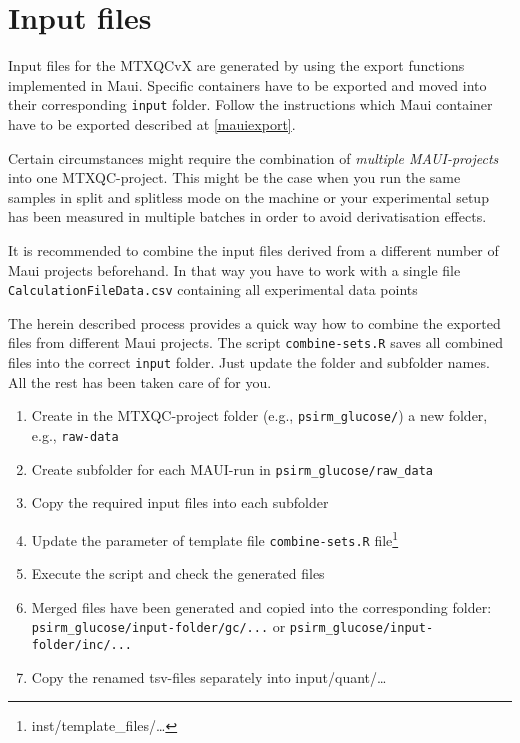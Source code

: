\documentclass[]{book}
\providecommand{\tightlist}{%
  \setlength{\itemsep}{0pt}\setlength{\parskip}{0pt}}
\let\rmarkdownfootnote\footnote%
\def\footnote{\protect\rmarkdownfootnote}
\theoremstyle{definition}
\theoremstyle{definition}
\theoremstyle{definition}
\theoremstyle{remark}
\begin{document}
\section{Input files}\label{input-files}

Input files for the MTXQCvX are generated by using the export functions
implemented in Maui. Specific containers have to be exported and moved
into their corresponding \texttt{input} folder. Follow the instructions
which Maui container have to be exported described at \ref{mauiexport}.

Certain circumstances might require the combination of \emph{multiple
MAUI-projects} into one MTXQC-project. This might be the case when you
run the same samples in split and splitless mode on the machine or your
experimental setup has been measured in multiple batches in order to
avoid derivatisation effects.

It is recommended to combine the input files derived from a different
number of Maui projects beforehand. In that way you have to work with a
single file \texttt{CalculationFileData.csv} containing all experimental
data points

The herein described process provides a quick way how to combine the
exported files from different Maui projects. The script
\texttt{combine-sets.R} saves all combined files into the correct
\texttt{input} folder. Just update the folder and subfolder names. All
the rest has been taken care of for you.

\begin{enumerate}
\def\labelenumi{\arabic{enumi}.}
\tightlist
\item
  Create in the MTXQC-project folder (e.g., \texttt{psirm\_glucose/}) a
  new folder, e.g., \texttt{raw-data}
\item
  Create subfolder for each MAUI-run in
  \texttt{psirm\_glucose/raw\_data}
\item
  Copy the required input files into each subfolder
\item
  Update the parameter of template file \texttt{combine-sets.R}
  file\footnote{inst/template\_files/\ldots{}}
\item
  Execute the script and check the generated files
\item
  Merged files have been generated and copied into the corresponding
  folder: \texttt{psirm\_glucose/input-folder/gc/...} or
  \texttt{psirm\_glucose/input-folder/inc/...}
\item
  Copy the renamed tsv-files separately into input/quant/\ldots{}
\end{enumerate}
\end{document}
